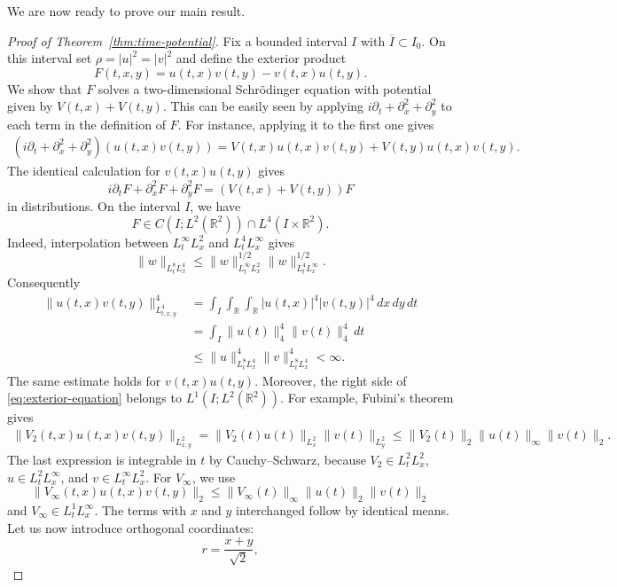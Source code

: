 \documentclass[11pt]{amsart}
\theoremstyle{remark}
\newcommand{\R}{\mathbb R}
\newcommand{\1}{\mathbf 1}
\begin{document}
We are now ready to prove our main result. 
\begin{proof}[Proof of Theorem~\ref{thm:time-potential}]
Fix a bounded interval $I$ with $\overline I\subset I_0$.  On this interval
set $\rho=|u|^2=|v|^2$ and define the exterior product
\[
 F(t,x,y)=u(t,x)v(t,y)-v(t,x)u(t,y).
 \tag{1.9}\label{eq:exterior-product}
\]
We show that $F$ solves a two-dimensional Schr\"odinger equation with potential given by $V(t,x)+V(t,y)$. This can be easily seen by applying
$i\partial_t+\partial_x^2+\partial_y^2$ to each term in the definition of $F$.  For instance, applying it to the first one gives
\begin{align*}
 (i\partial_t+\partial_x^2+\partial_y^2)
   (u(t,x)v(t,y))=V(t,x)u(t,x)v(t,y)+V(t,y)u(t,x)v(t,y).
\end{align*}
The identical calculation for $v(t,x)u(t,y)$ gives
\[
 i\partial_tF+\partial_x^2F+\partial_y^2F=(V(t,x)+V(t,y))F
 \tag{1.10}\label{eq:exterior-equation}
\]
in distributions. On the interval $I$, we have
\[
 F\in C(I;L^2(\R^2))\cap L^4(I\times\R^2).
 \tag{1.11}\label{eq:exterior-class}
\]
Indeed, interpolation between $L^\infty_tL^2_x$ and
$L^4_tL^\infty_x$ gives
\[
 \|w\|_{L^8_tL^4_x}
 \le\|w\|_{L^\infty_tL^2_x}^{1/2}
     \|w\|_{L^4_tL^\infty_x}^{1/2}.
\]
Consequently
\begin{equation*}
\begin{split}
 \|u(t,x)v(t,y)\|_{L^4_{t,x,y}}^4
 &=\int_I\int_\R\int_\R|u(t,x)|^4|v(t,y)|^4\,dx\,dy\,dt\\
 &=\int_I\|u(t)\|_4^4\|v(t)\|_4^4\,dt\\
 &\le\|u\|_{L^8_tL^4_x}^4\|v\|_{L^8_tL^4_x}^4<\infty.
\end{split}
\end{equation*}
The same estimate holds for $v(t,x)u(t,y)$.
Moreover, the right side of \eqref{eq:exterior-equation} belongs to
$L^1(I;L^2(\R^2))$.  For example, Fubini's theorem gives
\begin{align*}
 \|V_2(t,x)u(t,x)v(t,y)\|_{L^2_{x,y}}=\|V_2(t)u(t)\|_{L^2_x}\|v(t)\|_{L^2_y}
 \le\|V_2(t)\|_2\|u(t)\|_\infty\|v(t)\|_2.
\end{align*}
The last expression is integrable in $t$ by Cauchy--Schwarz, because
$V_2\in L^2_tL^2_x$, $u\in L^2_tL^\infty_x$, and
$v\in L^\infty_tL^2_x$.  For $V_\infty$, we use
\[
 \|V_\infty(t,x)u(t,x)v(t,y)\|_2
 \le\|V_\infty(t)\|_\infty\|u(t)\|_2\|v(t)\|_2
\]
and $V_\infty\in L^1_tL^\infty_x$.  The terms with $x$ and $y$ interchanged follow by identical means. Let us now introduce orthogonal coordinates:
\[
 r=\frac{x+y}{\sqrt2},
\]
\end{proof}
\end{document}
